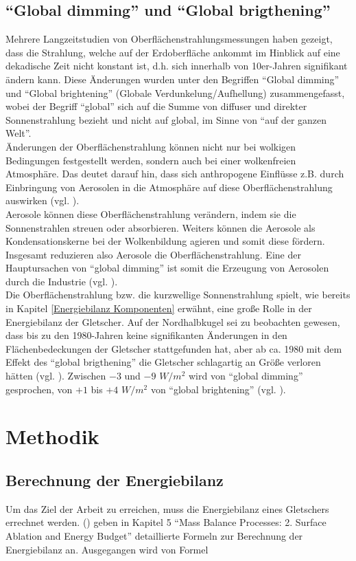 \documentclass[11pt,a4paper]{article}
\begin{document}
\subsection{``Global dimming'' und ``Global brigthening''}
Mehrere Langzeitstudien von Oberflächenstrahlungsmessungen haben gezeigt, dass die Strahlung, welche auf der Erdoberfläche ankommt im Hinblick auf eine dekadische Zeit nicht konstant ist, d.h. sich innerhalb von 10er-Jahren signifikant ändern kann. Diese Änderungen wurden unter den Begriffen ``Global dimming'' und ``Global brightening'' (Globale Verdunkelung/Aufhellung) zusammengefasst, wobei der Begriff ``global'' sich auf die Summe von diffuser und direkter Sonnenstrahlung bezieht und nicht auf global, im Sinne von ``auf der ganzen Welt''.\\
Änderungen der Oberflächenstrahlung können nicht nur bei wolkigen Bedingungen festgestellt werden, sondern auch bei einer wolkenfreien Atmosphäre. Das deutet darauf hin, dass sich anthropogene Einflüsse z.B. durch Einbringung von Aerosolen in die Atmosphäre auf diese Oberflächenstrahlung auswirken (vgl. \cite[1]{GlobalDimming}).\\
Aerosole können diese Oberflächenstrahlung verändern, indem sie die Sonnenstrahlen streuen oder absorbieren. Weiters können die Aerosole als Kondensationskerne bei der Wolkenbildung agieren und somit diese fördern. Insgesamt reduzieren also Aerosole die Oberflächenstrahlung. Eine der Hauptursachen von ``global dimming'' ist somit die Erzeugung von Aerosolen durch die Industrie (vgl. \cite[14]{GlobalDimming}).\\ 
Die Oberflächenstrahlung bzw. die kurzwellige Sonnenstrahlung spielt, wie bereits in Kapitel \ref{Energiebilanz Komponenten} erwähnt, eine große Rolle in der Energiebilanz der Gletscher. Auf der Nordhalbkugel sei zu beobachten gewesen, dass bis zu den 1980-Jahren keine signifikanten Änderungen in den Flächenbedeckungen der Gletscher stattgefunden hat, aber ab ca. 1980 mit dem Effekt des ``global brigthening'' die Gletscher schlagartig an Größe verloren hätten (vgl. \cite[24]{GlobalDimming}). Zwischen $-3$ und $-9$ $W/m^2$ wird von ``global dimming'' gesprochen, von $+1$ bis $+4$ $W/m^2$ von ``global brightening'' (vgl. \cite[28]{EnlighteningGlobalDimming}).


\pagebreak
\section{Methodik}
\subsection{Berechnung der Energiebilanz}
Um das Ziel der Arbeit zu erreichen, muss die Energiebilanz eines Gletschers errechnet werden. \citeauthor{ThePhysicsOfGlaciers} (\citeyear{ThePhysicsOfGlaciers}) geben in Kapitel 5 ``Mass Balance Processes: 2. Surface Ablation and Energy Budget'' detaillierte Formeln zur Berechnung der Energiebilanz an. Ausgegangen wird von Formel 
\end{document}
